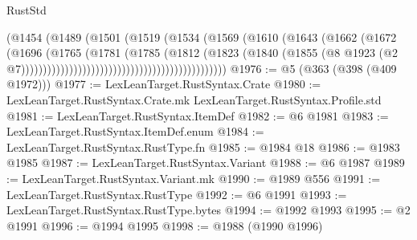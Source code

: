 \begin{lexlean}{RustStd}
\begin{coremodule}
                                                          (@1454
                                                            (@1489
                                                              (@1501
                                                                (@1519
                                                                  (@1534
                                                                    (@1569
                                                                      (@1610
                                                                        (@1643
                                                                          (@1662
                                                                            (@1672
                                                                              (@1696
                                                                                (@1765
                                                                                  (@1781
                                                                                    (@1785
                                                                                      (@1812
                                                                                        (@1823
                                                                                          (@1840
                                                                                            (@1855
                                                                                              (@8
                                                                                                @1923
                                                                                                (@2
                                                                                                  @7)))))))))))))))))))))))))))))))))))))))))))))))
@1976 := @5 (@363 (@398 (@409 @1972)))
@1977 := LexLeanTarget.RustSyntax.Crate
@1980 := LexLeanTarget.RustSyntax.Crate.mk LexLeanTarget.RustSyntax.Profile.std
@1981 := LexLeanTarget.RustSyntax.ItemDef
@1982 := @6 @1981
@1983 := LexLeanTarget.RustSyntax.ItemDef.enum
@1984 := LexLeanTarget.RustSyntax.RustType.fn
@1985 := @1984 @18
@1986 := @1983 @1985
@1987 := LexLeanTarget.RustSyntax.Variant
@1988 := @6 @1987
@1989 := LexLeanTarget.RustSyntax.Variant.mk
@1990 := @1989 @556
@1991 := LexLeanTarget.RustSyntax.RustType
@1992 := @6 @1991
@1993 := LexLeanTarget.RustSyntax.RustType.bytes
@1994 := @1992 @1993
@1995 := @2 @1991
@1996 := @1994 @1995
@1998 := @1988 (@1990 @1996)

\end{coremodule}
\end{lexlean}
